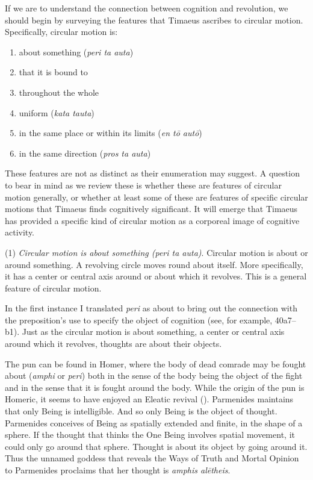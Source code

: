 If we are to understand the connection between cognition and revolution, we should begin by surveying the features that Timaeus ascribes to circular motion. Specifically, circular motion is:
\begin{enumerate}[(1)]
	\item about something (\emph{peri ta auta})
	\item that it is bound to
	\item throughout the whole
	\item uniform (\emph{kata tauta})
	\item in the same place or within its limits (\emph{en tō autō})
	\item in the same direction (\emph{pros ta auta})
\end{enumerate}
These features are not as distinct as their enumeration may suggest. A question to bear in mind as we review these is whether these are features of circular motion generally, or whether at least some of these are features of specific circular motions that Timaeus finds cognitively significant. It will emerge that Timaeus has provided a specific kind of circular motion as a corporeal image of cognitive activity.

(1) \emph{Circular motion is about something (\emph{peri ta auta})}. Circular motion is about or around something. A revolving circle moves round about itself. More specifically, it has a center or central axis around or about which it revolves. This is a general feature of circular motion. 

In the first instance I translated \emph{peri} as about to bring out the connection with the preposition's use to specify the object of cognition (see, for example, 40a7--b1). Just as the circular motion is about something, a center or central axis around which it revolves, thoughts are about their objects.

The pun can be found in Homer, where the body of dead comrade may be fought about (\emph{amphi} or \emph{peri}) both in the sense of the body being the object of the fight and in the sense that it is fought around the body. While the origin of the pun is Homeric, it seems to have enjoyed an Eleatic revival (\citealt[191--3]{Mourelatos:2008ve}). Parmenides maintains that only Being is intelligible. And so only Being is the object of thought. Parmenides conceives of Being as spatially extended and finite, in the shape of a sphere. If the thought that thinks the One Being involves spatial movement, it could only go around that sphere. Thought is about its object by going around it. Thus the unnamed goddess that reveals the Ways of Truth and Mortal Opinion to Parmenides proclaims that her thought is \emph{amphis alētheis}.

